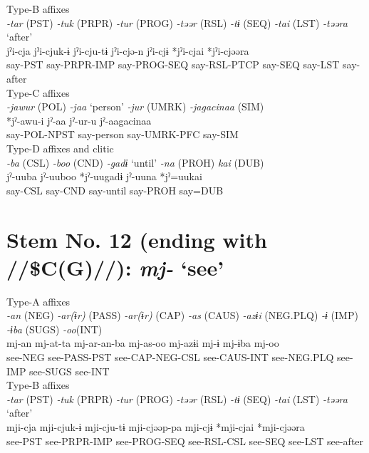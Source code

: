 \ex Type-B affixes\\
\glll \textit{-tar} (PST)  \textit{-tuk} (PRPR)  \textit{-tur} (PROG)  \textit{-təər} (RSL)  \textit{-tɨ} (SEQ)  \textit{-tai} (LST)  \textit{-təəra} ‘after’\\
jˀi-cja  jˀi-cjuk-ɨ  jˀi-cju-tɨ  jˀi-cjə-n  jˀi-cjɨ  *jˀi-cjai  *jˀi-cjəəra\\
say-PST  say-PRPR-IMP  say-PROG-SEQ  say-RSL-PTCP  say-SEQ  say-LST  say-after\\


\ex Type-C affixes\\
\glll \textit{-jawur} (POL)  \textit{-jaa} ‘person’  \textit{-jur} (UMRK)  \textit{-jagacinaa} (SIM)\\
*jˀ-awu-i  jˀ-aa  jˀ-ur-u  jˀ-aagacinaa\\
say-POL-NPST  say-person  say-UMRK-PFC  say-SIM\\


\ex Type-D affixes and clitic\\
\glll \textit{-ba} (CSL)  \textit{-boo} (CND)  \textit{-gadɨ} ‘until’  \textit{-na} (PROH)  \textit{kai} (DUB)\\
jˀ-uuba  jˀ-uuboo  *jˀ-uugadɨ  jˀ-uuna  *jˀ=uukai\\
say-CSL  say-CND  say-until  say-PROH  say=DUB\\
\z

\section{Stem No. 12 (ending with //\$C(G)//): \textit{mj-} ‘see’}

\ea Type-A affixes\\
\glll \textit{-an} (NEG)  \textit{-ar(ɨr)} (PASS)  \textit{-ar(ɨr)} (CAP)  \textit{-as} (CAUS)  \textit{-azɨi} (NEG.PLQ)  \textit{-ɨ} (IMP)  \textit{-ɨba} (SUGS)  \textit{-oo}(INT)\\
mj-an  mj-at-ta  mj-ar-an-ba  mj-as-oo  mj-azɨi  mj-ɨ  mj-ɨba  mj-oo\\
see-NEG  see-PASS-PST  see-CAP-NEG-CSL  see-CAUS-INT  see-NEG.PLQ  see-IMP  see-SUGS  see-INT\\


\ex Type-B affixes\\
\glll \textit{-tar} (PST)  \textit{-tuk} (PRPR)  \textit{-tur} (PROG)  \textit{-təər} (RSL)  \textit{-tɨ} (SEQ)  \textit{-tai} (LST)  \textit{-təəra} ‘after’\\
mji-cja  mji-cjuk-ɨ  mji-cju-tɨ  mji-cjəəp-pa  mji-cjɨ  *mji-cjai  *mji-cjəəra\\
see-PST  see-PRPR-IMP  see-PROG-SEQ  see-RSL-CSL  see-SEQ  see-LST  see-after\\


